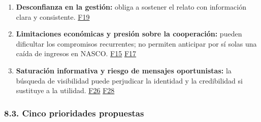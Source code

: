 \documentclass[
]{article}
\providecommand{\tightlist}{%
  \setlength{\itemsep}{0pt}\setlength{\parskip}{0pt}}
\begin{document}
\begin{enumerate}
\def\labelenumi{\arabic{enumi}.}
\tightlist
\item
  \textbf{Desconfianza en la gestión:} obliga a sostener el relato con
  información clara y consistente.
  \href{https://www.aefundraising.org/perfil-donante-2024-que-impulsa-a-los-espanoles-a-colaborar/}{F19}
\item
  \textbf{Limitaciones económicas y presión sobre la cooperación:}
  pueden dificultar los compromisos recurrentes; no permiten anticipar
  por sí solas una caída de ingresos en NASCO.
  \href{https://knowledge4policy.ec.europa.eu/publication/oecd-preliminary-official-development-assistance-levels-2025_en}{F15}
  \href{https://www.ine.es/dyngs/Prensa/es/ECV2025.htm}{F17}
\item
  \textbf{Saturación informativa y riesgo de mensajes oportunistas:} la
  búsqueda de visibilidad puede perjudicar la identidad y la
  credibilidad si sustituye a la utilidad.
  \href{https://trends.zorraquino.com/informes/consumer-trends/2026/brain-rot.html}{F26}
  \href{https://trends.zorraquino.com/informes/consumer-trends/2026/everythingcampaignable.html}{F28}
\end{enumerate}

\hypertarget{cinco-prioridades-propuestas}{%
\subsubsection{8.3. Cinco prioridades
propuestas}\label{cinco-prioridades-propuestas}}
\end{document}
